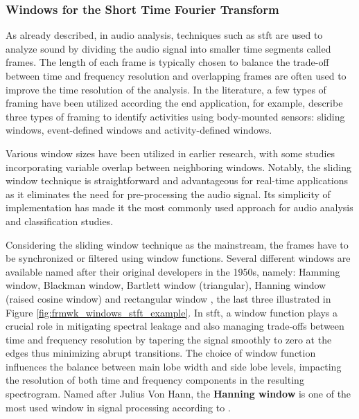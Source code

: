 \subsubsection{Windows for the Short Time Fourier Transform}
\label{subsubsec:audio_fundamentals_windowing_techniques}

As already described, in audio analysis, techniques such as \gls{stft} are used to analyze sound by dividing the audio signal into smaller time segments called frames.  The length of each frame is typically chosen to balance the trade-off between time and frequency resolution and overlapping frames are often used to improve the time resolution of the analysis. In the literature, a few types of framing have been utilized according the end application, for example, \textcite{Preece2009} describe three types of framing to identify activities using body-mounted sensors: sliding windows, event-defined windows and activity-defined windows.

 Various window sizes have been utilized in earlier research, with some studies incorporating variable overlap between neighboring windows. Notably, the sliding window technique is straightforward and advantageous for real-time applications as it eliminates the need for pre-processing the audio signal. Its simplicity of implementation has made it the most commonly used approach for audio analysis and classification studies.

Considering the sliding window technique as the mainstream, the frames have to be synchronized or filtered using window functions. Several different windows are available named after their original developers in the 1950s, namely: Hamming window, Blackman window, Bartlett window (triangular), Hanning window (raised cosine window) and rectangular window \cite{Smith2013}, the last three illustrated in Figure \ref{fig:frmwk_windows_stft_example}. In \gls{stft}, a window function plays a crucial role in mitigating spectral leakage and also managing trade-offs between time and frequency resolution by tapering the signal smoothly to zero at the edges thus minimizing abrupt transitions. The choice of window function influences the balance between main lobe width and side lobe levels, impacting the resolution of both time and frequency components in the resulting spectrogram. Named after Julius Von Hann, the \textbf{Hanning window} is one of the most used window in signal processing according to \textcite{Mueller2021}.

